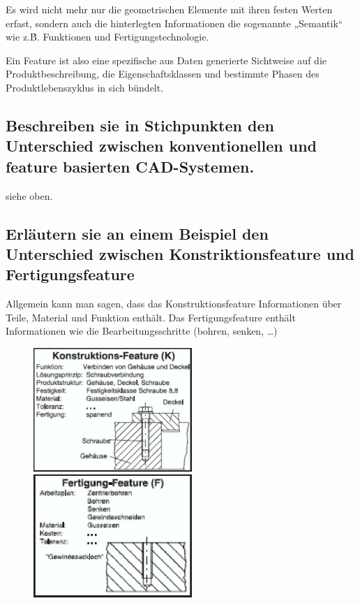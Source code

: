 Es wird nicht mehr nur die geometrischen Elemente mit ihren festen Werten
erfast, sondern auch die hinterlegten Informationen die sogenannte „Semantik“
wie z.\.B. Funktionen und Fertigungstechnologie.

Ein Feature ist also eine spezifische aus Daten generierte Sichtweise auf die
Produktbeschreibung, die Eigenschaftsklassen und bestimmte Phasen des
Produktlebenszyklus in sich bündelt.

\subsection*{%
    Beschreiben sie in Stichpunkten den Unterschied zwischen \glqq
    konventionellen\grqq {} und feature basierten CAD-Systemen.
}

siehe oben.

\subsection*{%
    Erläutern sie an einem Beispiel den Unterschied zwischen \glqq
    Konstriktionsfeature\grqq {} und \glqq Fertigungsfeature\grqq
}

Allgemein kann man sagen, dass das Konstruktionsfeature Informationen über
Teile, Material und Funktion enthält. Das Fertigungsfeature enthält
Informationen wie die Bearbeitungsschritte (bohren, senken, …)

\begin{center}
    \begin{figure}[h]
        \begin{minipage}[hbt]{7cm}
            \includegraphics[width=6cm]{Bild3_3_1.png}
        \end{minipage}
        \begin{minipage}[hbt]{7cm}
            \includegraphics[width=6cm]{Bild3_3_2.png}
        \end{minipage}
    \end{figure}
\end{center}

